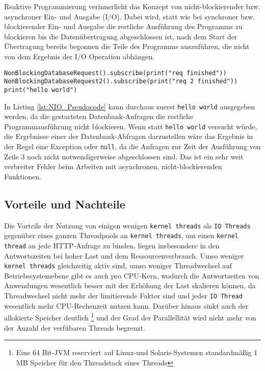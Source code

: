 Reaktive Programmierung verinnerlicht das Konzept von nicht-blockierender bzw. asynchroner Ein- und Ausgabe (I/O).
Dabei wird, statt wie bei synchroner bzw. blockierender Ein- und Ausgabe die restliche Ausführung des Programms
zu blockieren bis die Datenübertragung abgeschlossen ist, nach dem Start der Übertragung bereits begonnen die Teile des
Programms auszuführen, die nicht von dem Ergebnis der I/O Operation abhängen.

\begin{lstlisting}[caption=Pseudocode Nonblocking I/O (NIO), captionpos=b, label=lst:NIO_Pseudocode]
NonBlockingDatabaseRequest().subscribe(print("req finished"))
NonBlockingDatabaseRequest2().subscribe(print("req 2 finished"))
print("hello world")
\end{lstlisting}
In Listing \ref{lst:NIO_Pseudocode} kann durchaus zuerst \verb|hello world| ausgegeben werden, da die gestarteten Datenbank-Anfragen die
restliche Programmausführung nicht blockieren. Wenn statt \verb|hello world| versucht würde, die Ergebnisse einer der Datenbank-Abfragen
darzustellen wäre das Ergebnis in der Regel eine Exception oder \verb|null|, da die Anfragen zur Zeit der Ausführung von Zeile 3 noch nicht notwendigerweise
abgeschlossen sind. Das ist ein sehr weit verbreiter Fehler beim Arbeiten mit asynchronen, nicht-blockierenden Funktionen.

\subsection{Vorteile und Nachteile}
\label{subsec:vorteile_nachteile}

Die Vorteile der Nutzung von einigen wenigen \verb|kernel threads| als \verb|IO Threads| gegenüber eines ganzen Threadpools
an \verb|kernel threads|, um einen \verb|kernel thread| an jede HTTP-Anfrage zu binden, liegen insbesondere in den Antwortszeiten bei
hoher Last und dem Ressourcenverbrauch.
Umso weniger \verb|kernel threads| gleichzeitig aktiv sind, umso weniger Threadwechsel auf Betriebssystemebene
gibt es auch pro CPU-Kern, wodurch die Antwortzeiten von Anwendungen wesentlich besser mit der Erhöhung der Last skalieren können,
da Threadwechsel nicht mehr der limitierende Faktor sind und jeder \verb|IO Thread| wesentlich mehr CPU-Rechenzeit nutzen kann.
Darüber hinaus sinkt auch der allokierte Speicher deutlich
\footnote{Eine 64 Bit-JVM reserviert auf Linux-und Solaris-Systemen standardmäßig 1 MB Speicher für den Threadstack eines Threads}
und der Grad der Parallellität wird nicht mehr von der Anzahl der verfübaren Threads begrenzt.

